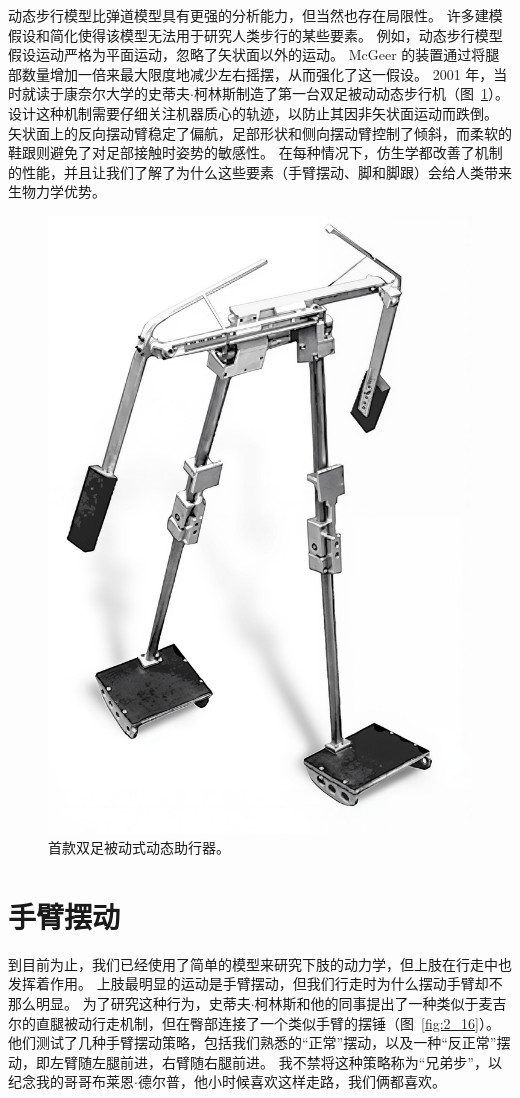 动态步行模型比弹道模型具有更强的分析能力，但当然也存在局限性。
许多建模假设和简化使得该模型无法用于研究人类步行的某些要素。
例如，动态步行模型假设运动严格为平面运动，忽略了矢状面以外的运动。
McGeer 的装置通过将腿部数量增加一倍来最大限度地减少左右摇摆，从而强化了这一假设。
2001 年，当时就读于康奈尔大学的史蒂夫$\cdot$柯林斯制造了第一台双足被动动态步行机（图~\ref{fig:2_15}）。
设计这种机制需要仔细关注机器质心的轨迹，以防止其因非矢状面运动而跌倒。
矢状面上的反向摆动臂稳定了偏航，足部形状和侧向摆动臂控制了倾斜，而柔软的鞋跟则避免了对足部接触时姿势的敏感性\cite{collins2001three}。
在每种情况下，仿生学都改善了机制的性能，并且让我们了解了为什么这些要素（手臂摆动、脚和脚跟）会给人类带来生物力学优势。


\begin{figure}[!htb]
	\centering
	\includegraphics[width=0.45\linewidth]{chap2/2_15}
	\caption{首款双足被动式动态助行器。 \label{fig:2_15}}
\end{figure}


\section{手臂摆动}

到目前为止，我们已经使用了简单的模型来研究下肢的动力学，但上肢在行走中也发挥着作用。
上肢最明显的运动是手臂摆动，但我们行走时为什么摆动手臂却不那么明显。
为了研究这种行为，史蒂夫$\cdot$柯林斯和他的同事提出了一种类似于麦吉尔的直腿被动行走机制，但在臀部连接了一个类似手臂的摆锤（图~\ref{fig:2_16}）。
他们测试了几种手臂摆动策略，包括我们熟悉的“正常”摆动，以及一种“反正常”摆动，即左臂随左腿前进，右臂随右腿前进。
我不禁将这种策略称为“兄弟步”，以纪念我的哥哥布莱恩$\cdot$德尔普，他小时候喜欢这样走路，我们俩都喜欢。


